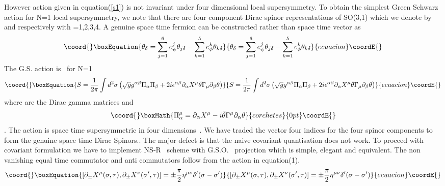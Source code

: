 \documentclass[a4paper,showpacs,preprintnumbers,amsmath,amssymb]{revtex4}
\begin{document}
However action given in equation(\ref{s1}) is not invariant under four
dimensional local supersymmetry. To obtain the simplest Green Schwarz action for N=1
local supersymmetry, we note that there are four component Dirac 
spinor representations of SO(3,1) which we denote by \coordHE{} and \coordHE{}
respectively with \myHighlight{$\delta$}\coordHE{}=1,2,3,4. A genuine space time fermion can be constructed rather 
than space time vector as
\begin{equation}\coord{}\boxEquation{
\theta_{\delta}=\sum^6_{j=1}e^j_{\psi}\theta_{j\delta} -
\sum^5_{k=1}e^k_{\phi}\theta_{k\delta}
}{
\theta_{\delta}=\sum^6_{j=1}e^j_{\psi}\theta_{j\delta} -
\sum^5_{k=1}e^k_{\phi}\theta_{k\delta}
}{ecuacion}\coordE{}\end{equation}
The G.S. action is~\cite{gr} for N=1
\begin{equation}\coord{}\boxEquation{
S=\frac{1}{2\pi}\int d^2\sigma \left ( \sqrt{g}g^{\alpha\beta}\Pi_{\alpha}\Pi_{\beta}
+2i\epsilon^{\alpha\beta}\partial_{\alpha}X^{\mu}\bar{\theta}\Gamma_{\mu}
\partial_{\beta}\theta\right )
}{
S=\frac{1}{2\pi}\int d^2\sigma \left ( \sqrt{g}g^{\alpha\beta}\Pi_{\alpha}\Pi_{\beta}
+2i\epsilon^{\alpha\beta}\partial_{\alpha}X^{\mu}\bar{\theta}\Gamma_{\mu}
\partial_{\beta}\theta\right )
}{ecuacion}\coordE{}\end{equation}
where \myHighlight{$\Gamma_{\mu}$}\coordHE{} are the Dirac gamma matrices and
\[\coord{}\boxMath{ \Pi^{\mu}_{\alpha}=\partial_{\alpha}X^{\mu}- i\bar{\theta}\Gamma^{\mu}\partial_
{\alpha}\theta}{corchetes}{0pt}\coordE{}\].
The action is space time supersymmetric in four dimensions~\cite{gr}. We have traded the
vector four indices \myHighlight{$\mu$}\coordHE{} for the four spinor components \myHighlight{$\delta$}\coordHE{} to form the genuine
space time Dirac Spinors..
The major defect is that the naive covariant quantisation does not work. To proceed with 
covariant formulation we have to implement NS-R~\cite{ne} scheme with G.S.O.~\cite{gl}
projection which is simple, elegant and equivalent.
The non vanishing equal time commutator and anti commutators follow from the action 
in equation(1).
\begin{equation}\coord{}\boxEquation{
\left [\partial_{\pm}X^{\mu}(\sigma ,\tau), \partial_{\pm}X^{\nu}(\sigma' ,\tau)
\right ] = \pm\frac{\pi}{2} \eta^{\mu\nu}\delta'(\sigma-\sigma')
}{
\left [\partial_{\pm}X^{\mu}(\sigma ,\tau), \partial_{\pm}X^{\nu}(\sigma' ,\tau)
\right ] = \pm\frac{\pi}{2} \eta^{\mu\nu}\delta'(\sigma-\sigma')
}{ecuacion}\coordE{}\end{equation}
\end{document}
